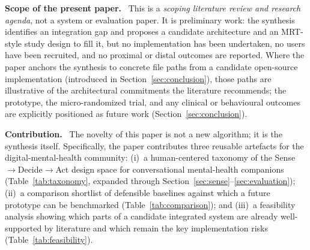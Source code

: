 \documentclass[10pt,conference]{article}
\newcommand{\secref}[1]{Section~\ref{#1}}
\newcommand{\tabref}[1]{Table~\ref{#1}}
\renewcommand{\paragraph}[1]{\smallskip\par\noindent\textbf{#1}~\ignorespaces}
\begin{document}
\paragraph{Scope of the present paper.}
This is a \emph{scoping literature review and research agenda}, not a
system or evaluation paper. It is preliminary work: the synthesis
identifies an integration gap and proposes a candidate architecture
and an MRT-style study design to fill it, but no implementation has
been undertaken, no users have been recruited, and no proximal or
distal outcomes are reported. Where the paper anchors the synthesis
to concrete file paths from a candidate open-source implementation
(introduced in \secref{sec:conclusion}), those paths are illustrative
of the architectural commitments the literature recommends; the
prototype, the micro-randomized trial, and any clinical or behavioural
outcomes are explicitly positioned as future work
(\secref{sec:conclusion}).

\paragraph{Contribution.}
The novelty of this paper is not a new algorithm; it is the synthesis
itself. Specifically, the paper contributes three reusable artefacts
for the digital-mental-health community:
(i)~a human-centered taxonomy of the Sense$\to$Decide$\to$Act design
space for conversational mental-health companions
(\tabref{tab:taxonomy}, expanded through
\secref{sec:sense}--\ref{sec:evaluation});
(ii)~a comparison shortlist of defensible baselines against which a
future prototype can be benchmarked (\tabref{tab:comparison}); and
(iii)~a feasibility analysis showing which parts of a candidate
integrated system are already well-supported by literature and which
remain the key implementation risks (\tabref{tab:feasibility}).
\end{document}
